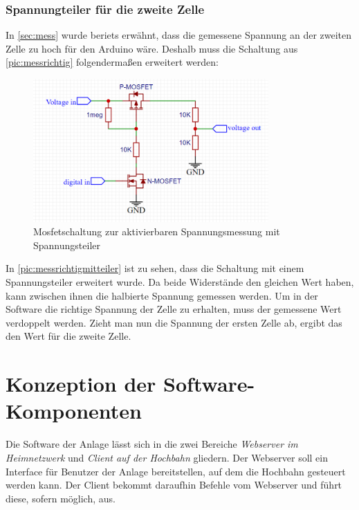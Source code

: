 \subsection{Spannungteiler für die zweite Zelle}
In \autoref{sec:mess} wurde beriets erwähnt, dass die gemessene Spannung an der zweiten Zelle zu hoch für den Arduino wäre. Deshalb muss die Schaltung aus \autoref{pic:messrichtig} folgendermaßen erweitert werden:

\begin{figure}[h]
	\begin{center}
		\includegraphics[width=9cm]{messMitTeiler.PNG}
		\caption{\label{pic:messrichtigmitteiler} Mosfetschaltung zur aktivierbaren Spannungsmessung mit Spannungsteiler}
	\end{center}
\end{figure}
\newpage
In \autoref{pic:messrichtigmitteiler} ist zu sehen, dass die Schaltung mit einem Spannungsteiler erweitert wurde. Da beide Widerstände den gleichen Wert haben, kann zwischen ihnen die halbierte Spannung gemessen werden. 
Um in der Software die richtige Spannung der Zelle zu erhalten, muss der gemessene Wert verdoppelt werden. Zieht man nun die Spannung der ersten Zelle ab, ergibt das den Wert für die zweite Zelle.

\chapter{Konzeption der Software-Komponenten}
\label{sec:software}
Die Software der Anlage lässt sich in die zwei Bereiche \textit{Webserver im Heimnetzwerk} und \textit{Client auf der Hochbahn} gliedern. Der Webserver soll ein Interface für Benutzer der Anlage bereitstellen, auf dem die Hochbahn gesteuert werden kann. 
Der Client bekommt daraufhin Befehle vom Webserver und führt diese, sofern möglich, aus. 

